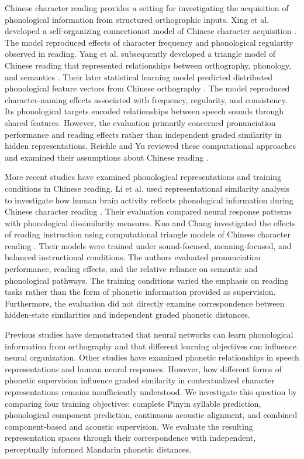 Chinese character reading provides a setting for investigating the acquisition
of phonological information from structured orthographic inputs. Xing et al.
developed a self-organizing connectionist model of Chinese character acquisition
\cite{ref_xing2002}. The model reproduced effects of character frequency and
phonological regularity observed in reading. Yang et al. subsequently developed
a triangle model of Chinese reading that represented relationships between
orthography, phonology, and semantics \cite{ref_yang2006}. Their later
statistical learning model predicted distributed phonological feature vectors
from Chinese orthography \cite{ref_yang2009}. The model reproduced
character-naming effects associated with frequency, regularity, and consistency.
Its phonological targets encoded relationships between speech sounds through
shared features. However, the evaluation primarily concerned pronunciation
performance and reading effects rather than independent graded similarity in
hidden representations. Reichle and Yu reviewed these computational approaches
and examined their assumptions about Chinese reading \cite{ref_reichle2018}.

More recent studies have examined phonological representations and training
conditions in Chinese reading. Li et al. used representational similarity
analysis to investigate how human brain activity reflects phonological
information during Chinese character reading \cite{ref_li_chinese2022}. Their
evaluation compared neural response patterns with phonological dissimilarity
measures. Kuo and Chang investigated the effects of reading instruction using
computational triangle models of Chinese character reading \cite{ref_kuo2025}.
Their models were trained under sound-focused, meaning-focused, and balanced
instructional conditions. The authors evaluated pronunciation performance,
reading effects, and the relative reliance on semantic and phonological
pathways. The training conditions varied the emphasis on reading tasks rather
than the form of phonetic information provided as supervision. Furthermore, the
evaluation did not directly examine correspondence between hidden-state
similarities and independent graded phonetic distances.

Previous studies have demonstrated that neural networks can learn phonological
information from orthography and that different learning objectives can
influence neural organization. Other studies have examined phonetic
relationships in speech representations and human neural responses. However, how
different forms of phonetic supervision influence graded similarity in
contextualized character representations remains insufficiently understood. We
investigate this question by comparing four training objectives: complete Pinyin
syllable prediction, phonological component prediction, continuous acoustic
alignment, and combined component-based and acoustic supervision. We evaluate
the resulting representation spaces through their correspondence with
independent, perceptually informed Mandarin phonetic distances.


